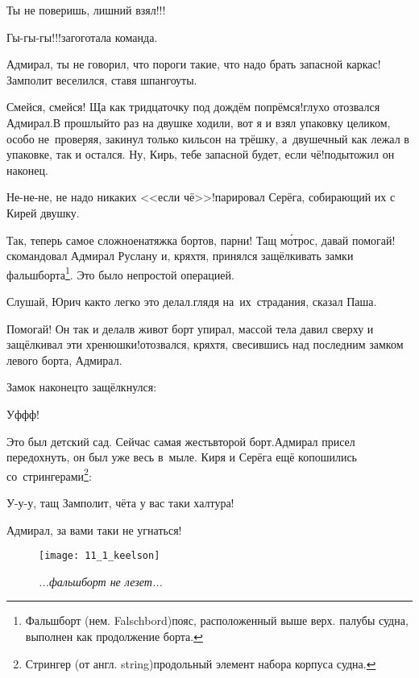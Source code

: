 \diagdash Ты не поверишь, лишний взял!!!

\diagdash Гы-гы-гы!!!\mdash загоготала команда.

\diagdash Адмирал, ты не говорил, что пороги такие, что надо брать запасной каркас!\mdash Замполит веселился, ставя шпангоуты.

\diagdash Смейся, смейся! Ща как тридцаточку под дождём попрёмся!\mdash глухо отозвался Адмирал.\mdash В прошлый\sdash то раз на двушке ходили, вот я и взял упаковку целиком, особо не~проверяя, закинул только кильсон на трёшку, а~двушечный как лежал в упаковке, так и остался. Ну, Кирь, тебе запасной будет, если чё!\mdash подытожил он наконец.

\diagdash Не-не-не, не надо никаких <<если чё>>!\mdash парировал Серёга, собирающий их с Кирей двушку.

\renewcommand*{\thefootnote}{\arabic{footnote}}
\setcounter{footnote}{0}
\diagdash Так, теперь самое сложное\mdash натяжка бортов, парни! Тащ м\'{о}трос, давай помогай!\mdash скомандовал Адмирал Руслану и, кряхтя, принялся защёлкивать замки фальшборта\footnote{Фальшборт (нем. Falschbord)\mdash пояс, расположенный выше верх. палубы судна, выполнен как продолжение борта.}. Это было непростой операцией.

\diagdash Слушай, Юрич как\sdash то легко это делал.\mdash глядя на~их~страдания, сказал Паша.

\diagdash Помогай! Он так и делал\mdash в живот борт упирал, массой тела давил сверху и защёлкивал эти хренюшки!\mdash отозвался, кряхтя, свесившись над последним замком левого борта, Адмирал. 

Замок наконец\sdash то защёлкнулся:

\diagdash Уф\sdash ф\sdash ф!

\diagdash Это был детский сад. Сейчас самая жесть\mdash второй борт.\mdash Адмирал присел передохнуть, он был уже весь в~мыле. Киря и Серёга ещё копошились со~стрингерами\footnote{Стрингер (от англ. string)\mdash продольный элемент набора корпуса судна.}: 

\diagdash У-у-у, тащ Замполит, чёта у вас таки халтура!

\diagdash Адмирал, за вами таки не угнаться!

{
	\setlength{\belowcaptionskip}{-9mm}
\begin{figure}[h]
	\centering
	\texttt{[image: 11\_1\_keelson]}
	\caption{\small\textit{...фальшборт не лезет...}}
\end{figure}
}

